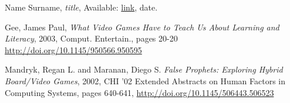 %
%
%
\begin{thebibliography}{1}

  Name Surname,
  \emph{title},
  Available: \url{link},
  date.

  Gee, James Paul,
  \emph{What Video Games Have to Teach Us About Learning and Literacy},
  2003,
  Comput. Entertain., pages 20-20
  \url{http://doi.org/10.1145/950566.950595}
  
  Mandryk, Regan L. and Maranan, Diego S.
  \emph{False Prophets: Exploring Hybrid Board/Video Games},
  2002,
  CHI '02 Extended Abstracts on Human Factors in Computing Systems, pages 
640-641,
  \url{http://doi.org/10.1145/506443.506523}
  
\end{thebibliography}